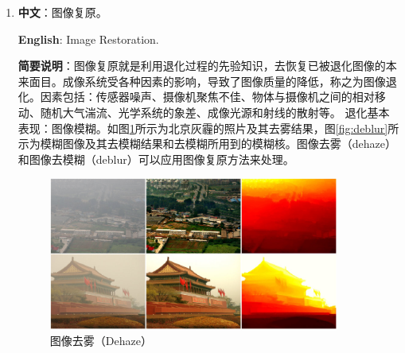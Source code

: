 \documentclass[14pt,a4paper]{extarticle}
\begin{document}
\begin{enumerate}
\item \textbf{中文}：图像复原。

\textbf{English}: Image Restoration.

\textbf{简要说明}：图像复原就是利用退化过程的先验知识，去恢复已被退化图像的本来面目。成像系统受各种因素的影响，导致了图像质量的降低，称之为图像退化。因素包括：传感器噪声、摄像机聚焦不佳、物体与摄像机之间的相对移动、随机大气湍流、光学系统的象差、成像光源和射线的散射等。 退化基本表现：图像模糊。如图\ref{fig:dehaze}所示为北京灰霾的照片及其去雾结果，图\ref{fig:deblur}所示为模糊图像及其去模糊结果和去模糊所用到的模糊核。图像去雾（dehaze）和图像去模糊（deblur）可以应用图像复原方法来处理。
\begin{figure}[!ht]
  \centering
  \includegraphics[width=0.9\textwidth]{Dehaze.jpg}
  \caption{图像去雾（Dehaze）}
  \label{fig:dehaze} %
\end{figure}
\begin{figure}[!ht]
  \centering 

\end{figure}
\end{enumerate}
\end{document}

